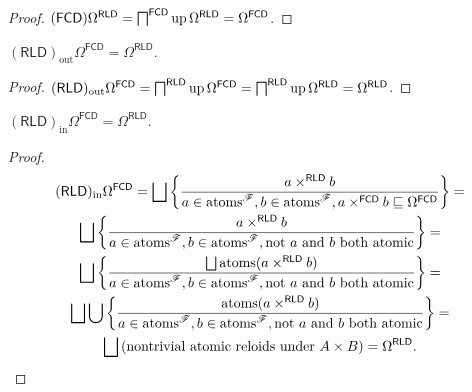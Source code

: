 \begin{proof}
  $(\mathsf{FCD}) \Omega^{\mathsf{RLD}} =
  \bigsqcap^{\mathsf{FCD}} \operatorname{up} \Omega^{\mathsf{RLD}} =
  \Omega^{\mathsf{FCD}}$.
\end{proof}

\begin{prop}
  $(\mathsf{RLD})_{\operatorname{out}} \Omega^{\mathsf{FCD}} =
  \Omega^{\mathsf{RLD}}$.
\end{prop}

\begin{proof}
  $(\mathsf{RLD})_{\operatorname{out}} \Omega^{\mathsf{FCD}} =
  \bigsqcap^{\mathsf{RLD}} \operatorname{up} \Omega^{\mathsf{FCD}} =
  \bigsqcap^{\mathsf{RLD}} \operatorname{up} \Omega^{\mathsf{RLD}} =
  \Omega^{\mathsf{RLD}}$.
\end{proof}

\begin{prop}
  $(\mathsf{RLD})_{\operatorname{in}} \Omega^{\mathsf{FCD}} = \Omega^{\mathsf{RLD}}$.
\end{prop}

\begin{proof}
  \begin{multline*}
  (\mathsf{RLD})_{\operatorname{in}} \Omega^{\mathsf{FCD}} = \bigsqcup
  \setcond{ a \times^{\mathsf{RLD}} b }{ a \in
  \atoms^{\mathscr{F}}, b \in \atoms^{\mathscr{F}}, a
  \times^{\mathsf{FCD}} b \sqsubseteq \Omega^{\mathsf{FCD}}
  } = \\
  \bigsqcup \setcond{ a \times^{\mathsf{RLD}} b }{
  a \in \atoms^{\mathscr{F}}, b \in
  \atoms^{\mathscr{F}}, \text{not $a$ and $b$ both atomic} } = \\
  \bigsqcup \setcond{ \bigsqcup \atoms (a \times^{\mathsf{RLD}} b)
  }{ a \in \atoms^{\mathscr{F}}, b \in
  \atoms^{\mathscr{F}}, \text{not $a$ and $b$ both atomic} } = \\
  \bigsqcup \bigcup \setcond{ \atoms (a \times^{\mathsf{RLD}} b) }{
  a \in \atoms^{\mathscr{F}}, b \in
  \atoms^{\mathscr{F}}, \text{not $a$ and $b$ both atomic} } = \\
  \bigsqcup \left( \text{nontrivial atomic reloids under $A \times B$} \right) =
  \Omega^{\mathsf{RLD}}.
  \end{multline*}
\end{proof}